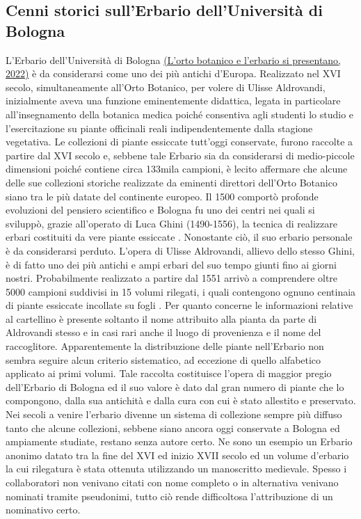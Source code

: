 \documentclass[main.tex]{subfiles}
\begin{document}
\subsection{Cenni storici sull'Erbario dell'Università di Bologna}\label{Cap. 1.1}

L’Erbario dell’Università di Bologna \href{https://sma.unibo.it/it/il-sistema-museale/orto-botanico-ed-erbario/}{(L’orto botanico e l’erbario si presentano, 2022)} è da considerarsi come uno dei più antichi d’Europa. Realizzato nel XVI secolo, simultaneamente all’Orto Botanico, per volere di Ulisse Aldrovandi, inizialmente aveva una funzione eminentemente didattica, legata in particolare all’insegnamento della botanica medica poiché consentiva agli studenti lo studio e l’esercitazione su piante officinali reali indipendentemente dalla stagione vegetativa.
Le collezioni di piante essiccate tutt’oggi conservate, furono raccolte a partire dal XVI secolo e, sebbene tale Erbario sia da considerarsi di medio-piccole dimensioni poiché contiene circa 133mila campioni, è lecito affermare che alcune delle sue collezioni storiche realizzate da eminenti direttori dell’Orto Botanico siano tra le più datate del continente europeo.
Il 1500 comportò profonde evoluzioni del pensiero scientifico e Bologna fu uno dei centri nei quali si sviluppò, grazie all’operato di Luca Ghini (1490-1556), la tecnica di realizzare erbari costituiti da vere piante essiccate \citep{von}. Nonostante ciò, il suo erbario personale è da considerarsi perduto.
L’opera di Ulisse Aldrovandi, allievo dello stesso Ghini, è di fatto uno dei più antichi e ampi erbari del suo tempo giunti fino ai giorni nostri. Probabilmente realizzato a partire dal 1551 arrivò a comprendere oltre 5000 campioni suddivisi in 15 volumi rilegati, i quali contengono ognuno centinaia di piante essiccate incollate su fogli \citep{mira}. Per quanto concerne le informazioni relative al cartellino è presente soltanto il nome attribuito alla pianta da parte di Aldrovandi stesso e in casi rari anche il luogo di provenienza e il nome del raccoglitore. Apparentemente la distribuzione delle piante nell’Erbario non sembra seguire alcun criterio sistematico, ad eccezione di quello alfabetico applicato ai primi volumi. Tale raccolta costituisce l’opera di maggior pregio dell’Erbario di Bologna ed il suo valore è dato dal gran numero di piante che lo compongono, dalla sua antichità e dalla cura con cui è stato allestito e preservato.
Nei secoli a venire l’erbario divenne un sistema di collezione sempre più diffuso tanto che alcune collezioni, sebbene siano ancora oggi conservate a Bologna ed ampiamente studiate, restano senza autore certo. Ne sono un esempio un Erbario anonimo datato tra la fine del XVI ed inizio XVII secolo ed un volume d’erbario la cui rilegatura è stata ottenuta utilizzando un manoscritto medievale. Spesso i collaboratori non venivano citati con nome completo o in alternativa venivano nominati tramite pseudonimi, tutto ciò rende difficoltosa l’attribuzione di un nominativo certo.
\end{document}
